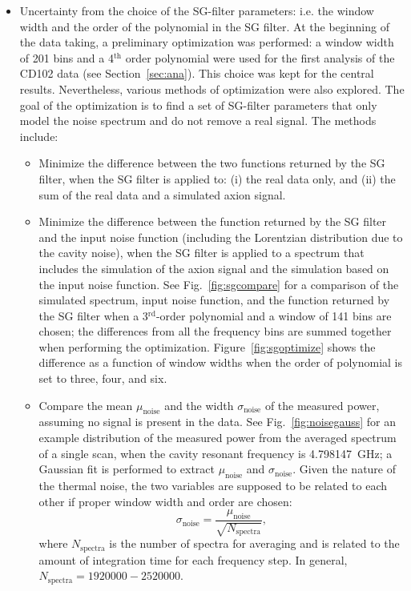 \begin{itemize}
\item Uncertainty from the choice of the SG-filter parameters: i.e.  
the window width and the order of the polynomial in the SG filter. At the 
beginning of the data taking, a preliminary optimization was performed: a 
window width of 201 bins and a 4$^\text{th}$ order polynomial were used for 
the first analysis of the CD102 data (see Section~\ref{sec:ana}). 
This choice was kept for the central results. 
Nevertheless, various methods of optimization were also explored. The goal 
of the optimization is to find a set of SG-filter parameters that only 
model the noise spectrum and do not remove a real signal. 
The methods include:
\begin{itemize}
 \item Minimize the difference between the two functions returned by the SG 
filter, when the SG filter is applied to: (i) the real data only, and (ii) 
the sum of the real data and a simulated axion signal. 
 \item Minimize the difference between the function returned by the 
 SG filter and the input noise function (including the Lorentzian distribution 
due to the cavity noise), when the SG filter is applied to
a spectrum that includes the simulation of the axion signal and 
the simulation based on the input noise function. See Fig.~\ref{fig:sgcompare} 
for a comparison of  the simulated spectrum, input noise function, and the 
function returned by 
 the SG filter when a 3$^\text{rd}$-order polynomial and a window of 141 
 bins are chosen; the differences from all the frequency bins are summed 
 together when performing the optimization.
 Figure~\ref{fig:sgoptimize} shows the difference 
as a function of window widths when the order of polynomial is 
 set to three, four, and six. 
 \item Compare the mean $\mu_\text{noise}$ and the width $\sigma_\text{noise}$ 
of the measured power, assuming no signal is present in the 
data. See Fig.~\ref{fig:noisegauss} for an example distribution 
of the measured power from the averaged spectrum of a 
single scan, when the cavity resonant frequency 
is 4.798147~GHz; a Gaussian fit is performed to extract 
$\mu_\text{noise}$ and $\sigma_\text{noise}$. Given the nature of the 
thermal noise, the two variables are supposed to be related to 
each other if proper window width and order are chosen:
\begin{equation*} 
\sigma_\text{noise} = \frac{\mu_\text{noise}}{\sqrt{N_\text{spectra}}},
\end{equation*}
where $N_\text{spectra}$ is the number of spectra for averaging and 
is related to the amount of integration time for each frequency step. In 
general, $N_\text{spectra}=1920000-2520000$. 
\end{itemize}


\end{itemize}
